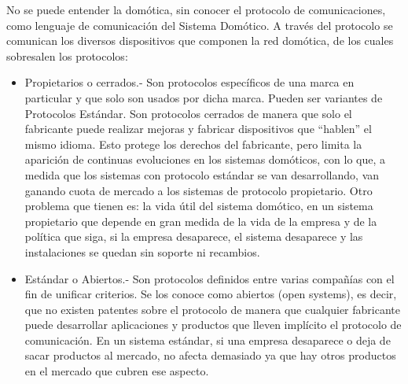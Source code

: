 \documentclass[11pt,letterpaper]{report}
\begin{document}
No se puede entender la domótica, sin conocer el protocolo de comunicaciones, como lenguaje de comunicación del Sistema Domótico. A través del protocolo se comunican los diversos dispositivos que componen la red domótica, de los cuales sobresalen los protocolos:
		\begin{itemize}
		\item Propietarios o cerrados.- Son protocolos específicos de una marca en particular y que solo son usados por dicha marca. Pueden ser variantes de Protocolos Estándar.
Son protocolos cerrados de manera que solo el fabricante puede realizar mejoras y fabricar dispositivos que “hablen” el mismo idioma.
Esto protege los derechos del fabricante, pero limita la aparición de continuas evoluciones en los sistemas domóticos, con lo que, a medida que los sistemas con protocolo estándar se van desarrollando, van ganando cuota de mercado a los sistemas de protocolo propietario.
Otro problema que tienen es: la vida útil del sistema domótico, en un sistema propietario que depende en gran medida de la vida de la empresa y de la política que siga, si la empresa desaparece, el sistema desaparece y las instalaciones se quedan sin soporte ni recambios.
		\item Estándar o Abiertos.- Son protocolos definidos entre varias compañías con el fin de unificar criterios.
Se los conoce como abiertos (open systems), es decir, que no existen patentes sobre el protocolo de manera que cualquier fabricante puede desarrollar aplicaciones y productos que lleven implícito el protocolo de comunicación.
En un sistema estándar, si una empresa desaparece o deja de sacar productos al mercado, no afecta demasiado ya que hay otros productos en el mercado que cubren ese aspecto.

		\end{itemize}
\end{document}
